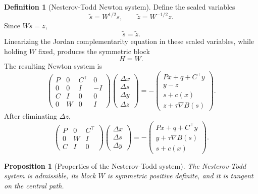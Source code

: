 \documentclass[a4paper,11pt]{book}
\theoremstyle{plain}
\newtheorem{proposition}[theorem]{Proposition}
\theoremstyle{definition}
\newtheorem{definition}[theorem]{Definition}
\theoremstyle{remark}
\numberwithin{equation}{chapter}
\numberwithin{algorithm}{chapter}
\begin{document}
	\begin{definition}[Nesterov-Todd Newton system]
		Define the scaled variables
		\[
		\widetilde s=W^{1/2}s,
		\qquad
		\widetilde z=W^{-1/2}z.
		\]
		Since \(Ws=z\),
		\[
		\widetilde s=\widetilde z.
		\]
		Linearizing the Jordan complementarity equation in these scaled variables,
		while holding \(W\) fixed, produces the symmetric block
		\[
		H=W.
		\]
		The resulting Newton system is
		\begin{equation}
			\begin{pmatrix}
				P & 0 & C^\top & 0\\
				0 & 0 & I      & -I\\
				C & I & 0      & 0\\
				0 & W & 0      & I
			\end{pmatrix}
			\begin{pmatrix}
				\Delta x\\
				\Delta s\\
				\Delta y\\
				\Delta z
			\end{pmatrix}
			=
			-
			\begin{pmatrix}
				Px+q+C^\top y\\
				y-z\\
				s+c(x)\\
				z+\tau\nabla B(s)
			\end{pmatrix}.
			\label{eq:nt-newton-system}
		\end{equation}
		After eliminating \(\Delta z\),
		\begin{equation}
			\begin{pmatrix}
				P & 0 & C^\top\\
				0 & W & I\\
				C & I & 0
			\end{pmatrix}
			\begin{pmatrix}
				\Delta x\\
				\Delta s\\
				\Delta y
			\end{pmatrix}
			=
			-
			\begin{pmatrix}
				Px+q+C^\top y\\
				y+\tau\nabla B(s)\\
				s+c(x)
			\end{pmatrix}.
		\end{equation}
	\end{definition}
	
	\begin{proposition}[Properties of the Nesterov-Todd system]
		The Nesterov-Todd system is admissible, its block \(W\) is symmetric positive
		definite, and it is tangent on the central path.
	\end{proposition}
	
\end{document}
